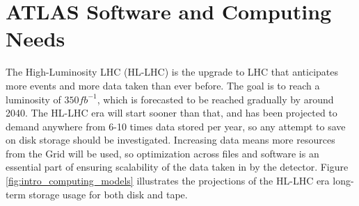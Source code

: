 \section{ATLAS Software and Computing Needs}
The High-Luminosity LHC (HL-LHC) is the upgrade to LHC that anticipates more events and more data taken than ever before.
The goal is to reach a luminosity of $350 fb^{-1}$, which is forecasted to be reached gradually by around 2040.\cite{HL-LHC_Tech_design}
The HL-LHC era will start sooner than that, and has been projected to demand anywhere from 6-10 times data stored per year, so any attempt to save on disk storage should be investigated.\cite{ATLAS_HL-LHC_projections}
Increasing data means more resources from the Grid will be used, so optimization across files and software is an essential part of ensuring scalability of the data taken in by the detector.
Figure \ref{fig:intro_computing_models} illustrates the projections of the HL-LHC era long-term storage usage for both disk and tape. 

